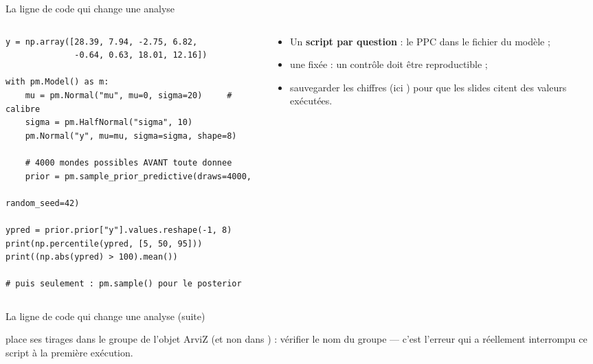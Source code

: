 \begin{frame}[fragile]{La ligne de code qui change une analyse}
\begin{columns}[t]
\begin{column}{0.54\textwidth}
\begin{codebox}
\begin{lstlisting}
y = np.array([28.39, 7.94, -2.75, 6.82,
              -0.64, 0.63, 18.01, 12.16])

with pm.Model() as m:
    mu = pm.Normal("mu", mu=0, sigma=20)     # calibre
    sigma = pm.HalfNormal("sigma", 10)
    pm.Normal("y", mu=mu, sigma=sigma, shape=8)

    # 4000 mondes possibles AVANT toute donnee
    prior = pm.sample_prior_predictive(draws=4000,
                                       random_seed=42)

ypred = prior.prior["y"].values.reshape(-1, 8)
print(np.percentile(ypred, [5, 50, 95]))
print((np.abs(ypred) > 100).mean())

# puis seulement : pm.sample() pour le posterior
\end{lstlisting}
\end{codebox}
\end{column}
\begin{column}{0.43\textwidth}
\begin{kbox}
\begin{itemize}
  \item Un \textbf{script par question} : le PPC dans le fichier du modèle ;
  \item une  fixée : un contrôle doit être reproductible ;
  \item sauvegarder les chiffres (ici )
        pour que les slides citent des valeurs exécutées.
\end{itemize}
\end{kbox}
\end{column}
\end{columns}
\end{frame}

\begin{frame}{La ligne de code qui change une analyse (suite)}
\begin{wbox}
 place ses tirages dans le groupe  de
l'objet ArviZ (et non dans ) : vérifier le nom du groupe
— c'est l'erreur qui a réellement interrompu ce script à la première exécution.
\end{wbox}
\end{frame}

